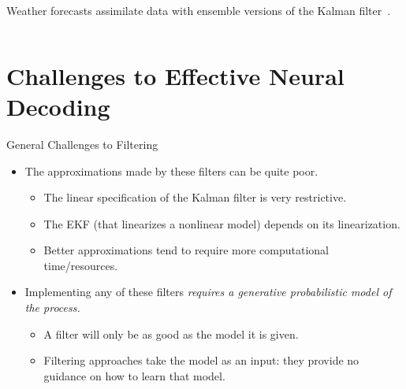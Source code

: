 \documentclass[aspectratio=169,19pt,xetex,handout]{beamer}
\begin{document}
\begin{frame}[b]{}

\begin{columns}
\begin{block}{}
\Large
\color{black} Weather forecasts assimilate data with ensemble versions of the Kalman filter~\cite{Gei94,Bis01,Ott04,Hun07,Bue17}.
\end{block}
\end{columns}

\end{frame}


\section{Challenges to Effective Neural Decoding}

\begin{frame}{General Challenges to Filtering}
\Large
\begin{itemize}
    \item The approximations made by these filters can be quite poor.
    \begin{itemize}
        \item The linear specification of the Kalman filter is very restrictive.
        \item The EKF (that linearizes a nonlinear model) depends on its linearization.
        \item Better approximations tend to require more computational time/resources.
    \end{itemize}
    \medskip
    \item Implementing any of these filters \emph{requires a generative probabilistic model of the process.}
        \begin{itemize}
        \item A filter will only be as good as the model it is given.
        \item Filtering approaches take the model as an input: they provide no guidance on how to learn that model.
    \end{itemize}
\end{itemize}
\end{frame}
\end{document}
